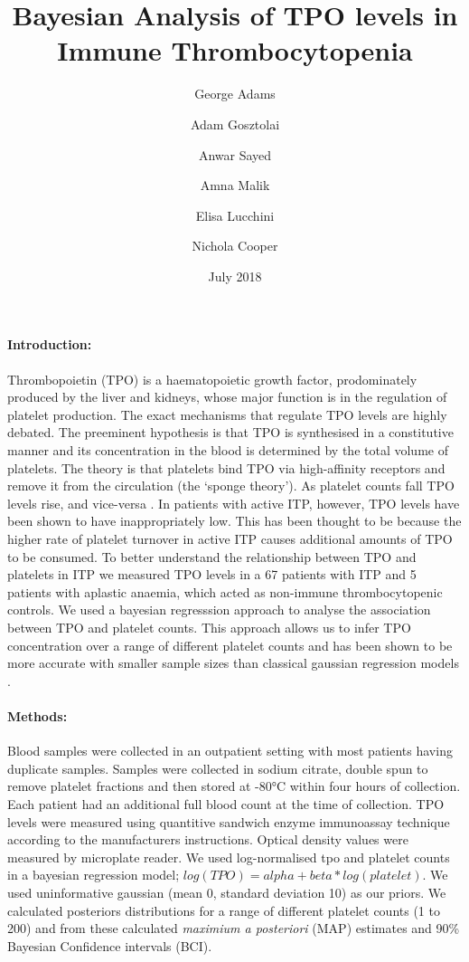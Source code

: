 \documentclass[11pt]{article}
\title{Bayesian Analysis of TPO levels in Immune Thrombocytopenia}
\author[1,2]{\small George Adams}
\author[1]{\small Adam Gosztolai}
\author[1]{\small Anwar Sayed}
\author[1]{\small Amna Malik}
\author[1]{\small Elisa Lucchini}
\author[1,2]{\small Nichola Cooper}
\affil[1]{\footnotesize Imperial College London, Kensington, London SW7 2AZ}
\affil[2]{\footnotesize Hammersmith Hospital, Imperial College NHS Trust, London W12 0HS}
\date{July 2018}
\begin{document}
\maketitle

\paragraph{Introduction:} Thrombopoietin (TPO) is a haematopoietic growth factor, prodominately produced by the liver and kidneys, whose major function is in the regulation of platelet production. The exact mechanisms that regulate TPO levels are highly debated. The preeminent hypothesis is that TPO is synthesised in a constitutive manner and its concentration in the blood is determined by the total volume of platelets. The theory is that platelets bind TPO via high-affinity receptors and remove it from the circulation (the `sponge theory'). As platelet counts fall TPO levels rise, and vice-versa \cite{EtoLinkagemechanismsthrombocytopenia2016}. %
In patients with active ITP, however, TPO levels have been shown to have inappropriately low. This has been thought to be because the higher rate of platelet turnover in active ITP causes additional amounts of TPO to be consumed. To better understand the relationship between TPO and platelets in ITP we measured TPO levels in a 67 patients with ITP and 5 patients with aplastic anaemia, which acted as non-immune thrombocytopenic controls. We used a bayesian regresssion approach to analyse the association between TPO and platelet counts. This approach allows us to infer TPO concentration over a range of different platelet counts and has been shown to be more accurate with smaller sample sizes than classical gaussian regression models \cite{GoldsteinBayesiananalysisregression1976}.


\paragraph{Methods:} Blood samples were collected in an outpatient setting with most patients having duplicate samples. Samples were collected in sodium citrate, double spun to remove platelet fractions and then stored at -80°C within four hours of collection. Each patient had an additional full blood count at the time of collection. TPO levels were measured using quantitive sandwich enzyme immunoassay technique according to the manufacturers instructions. Optical density values were measured by microplate reader. We used log-normalised tpo and platelet counts in a bayesian regression model; $log(TPO) = alpha + beta*log(platelet)$. We used uninformative gaussian (mean 0, standard deviation 10) as our priors. We calculated posteriors distributions for a range of different platelet counts (1 to 200) and from these calculated \textit{maximium a posteriori} (MAP) estimates and 90\% Bayesian Confidence intervals (BCI).
\end{document}
